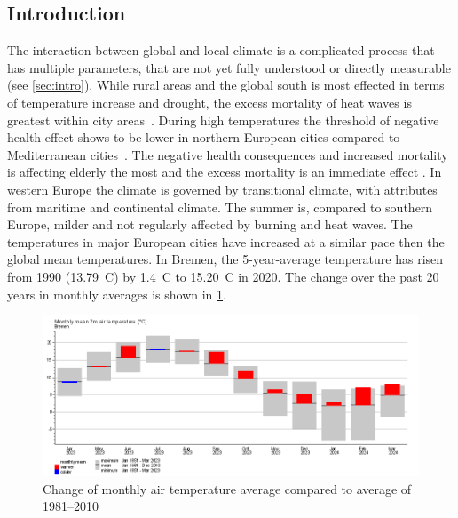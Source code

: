 \documentclass[12pt,a4paper, english,twoside]{scrartcl}
\begin{document}
    \subsection{Introduction}
      The interaction between global and local climate is a complicated process that has multiple parameters, that are not yet fully understood or directly measurable (see \cref{sec:intro}).  
      While rural areas and the global south is most effected in terms of temperature increase and drought, the excess mortality of heat waves is greatest within city areas~\autocite{Gabriel2011}. During high temperatures the threshold of negative health effect shows to be lower in northern European cities compared to Mediterranean cities~\autocite{Baccini2008}. 
      The negative health consequences and increased mortality is affecting elderly the most and the excess mortality is an immediate effect \autocite{Baccini2008}. 
      In western Europe the climate is governed by transitional climate, with attributes from maritime and continental climate.
      The summer is, compared to southern Europe, milder and not regularly affected by burning and heat waves. 
      The temperatures in major European cities have increased at a similar pace then the global mean temperatures. 
      In Bremen, the 5-year-average temperature has risen from 1990 (13.79\textdegree\ C)  by 1.4\textdegree\ C to 15.20\textdegree\ C in 2020.
      The change over the past 20 years in monthly averages is shown in \cref{fig:monthAvg}.
      \begin{figure}[!htbp]
          \centering
          \includegraphics[width=\textwidth]{img/BremenClimateAvgDiff2023.png}
          \caption{Change of monthly air temperature average compared to average of 1981--2010~\autocite{DWD2024a}\label{fig:monthAvg}}
      \end{figure}
\end{document}
